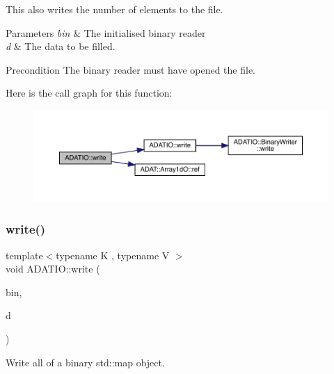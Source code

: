This also writes the number of elements to the file. 
\begin{DoxyParams}{Parameters}
{\em bin} & The initialised binary reader \\
\hline
{\em d} & The data to be filled.\\
\hline
\end{DoxyParams}
\begin{DoxyPrecond}{Precondition}
The binary reader must have opened the file. 
\end{DoxyPrecond}
Here is the call graph for this function\+:\nopagebreak
\begin{figure}[H]
\begin{center}
\leavevmode
\includegraphics[width=350pt]{d0/dba/namespaceADATIO_aea9e3ff6a488ce22e363d16085c76a85_cgraph}
\end{center}
\end{figure}
\mbox{\label{namespaceADATIO_acc2655a91a7a0608906b55f7533bde55}} 
\subsubsection{\texorpdfstring{write()}{write()}\hspace{0.1cm}{\footnotesize\ttfamily [24/25]}}
{\footnotesize\ttfamily template$<$typename K , typename V $>$ \\
void A\+D\+A\+T\+I\+O\+::write (\begin{DoxyParamCaption}\item[{\mbox{\hyperlink{classADATIO_1_1BinaryWriter}{Binary\+Writer}} \&}]{bin,  }\item[{const std\+::map$<$ K, V $>$ \&}]{d }\end{DoxyParamCaption})\hspace{0.3cm}{\ttfamily [inline]}}



Write all of a binary std\+::map object. 

